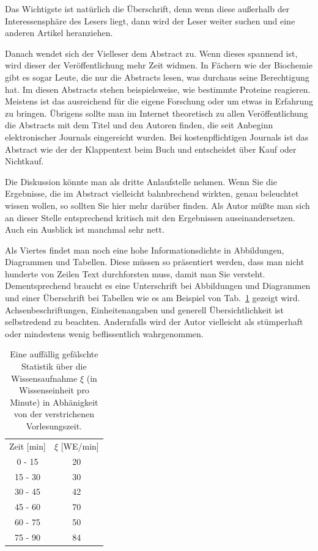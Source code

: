 \documentclass[10pt,twocolumn]{scrartcl}
\begin{document}
Das Wichtigste ist natürlich die Überschrift, denn wenn diese außerhalb
der Interessensphäre des Lesers liegt, dann wird der Leser weiter suchen
und eine anderen Artikel heranziehen.

Danach wendet sich der Vielleser dem Abstract zu. Wenn dieses spannend ist,
wird dieser der Veröffentlichung mehr Zeit widmen. In Fächern wie der
Biochemie gibt es sogar Leute, die nur die Abstracts lesen, was durchaus
seine Berechtigung hat. Im diesen Abstracts stehen beispielsweise, 
wie bestimmte Proteine reagieren. Meistens ist das ausreichend für 
die eigene Forschung oder um etwas in Erfahrung zu bringen.
Übrigens sollte man im Internet theoretisch zu allen Veröffentlichung
die Abstracts mit dem Titel und den Autoren finden, die seit Anbeginn 
elektronischer Journals eingereicht wurden. Bei kostenpflichtigen 
Journals ist das Abstract wie der der Klappentext beim Buch und
entscheidet über Kauf oder Nichtkauf.

Die Diskussion könnte man als dritte Anlaufstelle nehmen. Wenn Sie 
die Ergebnisse, die im Abstract vielleicht bahnbrechend wirkten, genau 
beleuchtet wissen wollen, so sollten Sie hier mehr darüber
finden. Als Autor müßte man sich an dieser Stelle entsprechend 
kritisch mit den Ergebnissen auseinandersetzen. Auch ein Ausblick
ist manchmal sehr nett.

Als Viertes findet man noch eine hohe Informationsdichte in
Abbildungen, Diagrammen und Tabellen. Diese müssen so präsentiert werden,
dass man nicht hunderte von Zeilen Text durchforsten muss, damit man Sie versteht.
Dementsprechend braucht es eine Unterschrift bei Abbildungen und Diagrammen 
und einer Überschrift bei Tabellen wie es am Beispiel von Tab.~\ref{tab:falsch}
gezeigt wird. Achsenbeschriftungen, Einheitenangaben
und generell Übersichtlichkeit ist selbstredend zu beachten.
Andernfalls wird der Autor vielleicht als stümperhaft oder mindestens
wenig beflissentlich wahrgenommen.

\begin{table}[t]
\caption{Eine auffällig gefälschte Statistik über die Wissensaufnahme $\xi$
(in Wissenseinheit pro Minute) in Abhänigkeit von der verstrichenen Vorlesungszeit.}
\label{tab:falsch}
\centering
\begin{tabular}{cc}
\rowcolor{dunkelgrau}
Zeit [min] & $\xi$ [WE/min] \\
0 - 15 & 20 \\
\rowcolor{grau}
15 - 30 & 30 \\
30 - 45 & 42 \\
\rowcolor{grau}
45 - 60 & 70 \\
60 - 75 & 50 \\
\rowcolor{grau}
75 - 90 & 84
\end{tabular}
\end{table}
\end{document}
